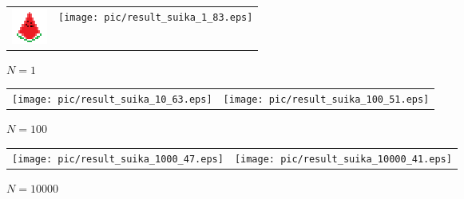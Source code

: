 \documentclass{thesis}
\begin{document}
\begin{figure}[H]
  \begin{tabular}{cc}
    \begin{minipage}[t]{0.45\hsize}
      \centering
      \includegraphics[width=0.5\linewidth]{pic/suika.eps}
      \caption{目的画像}
      \label{suika_pic}
    \end{minipage} &
    \begin{minipage}[t]{0.45\hsize}
    \centering
      \texttt{[image: pic/result\_suika\_1\_83.eps]}
       \caption{$N=1$}
      \label{fig:output_1}
      \end{minipage}
  \end{tabular}
\end{figure}

\begin{figure}[H]
  \begin{tabular}{cc}
    \begin{minipage}[t]{0.45\hsize}
      \centering
      \texttt{[image: pic/result\_suika\_10\_63.eps]}
       \caption{$N=10$}
      \label{fig:output_10}
    \end{minipage} &
    \begin{minipage}[t]{0.45\hsize}
     \centering
      \texttt{[image: pic/result\_suika\_100\_51.eps]}
       \caption{$N=100$}
      \label{fig:output_100}
      \end{minipage}
  \end{tabular}
\end{figure}


\begin{figure}[H]
  \begin{tabular}{cc}
    \begin{minipage}[t]{0.45\hsize}
     \centering
      \texttt{[image: pic/result\_suika\_1000\_47.eps]}
      \caption{$N=1000$}
      \label{fig:output_1000}
    \end{minipage} &
    \begin{minipage}[t]{0.45\hsize}
     \centering
      \texttt{[image: pic/result\_suika\_10000\_41.eps]}
       \caption{$N=10000$}
      \label{fig:output_10000}
      \end{minipage}
  \end{tabular}
\end{figure}
    
\end{document}
